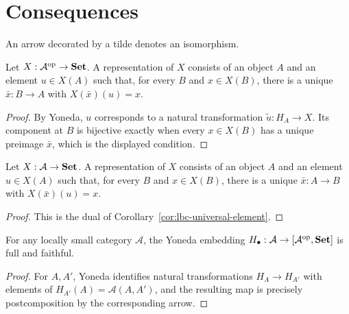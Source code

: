 \section{Consequences}
\begin{notation}
\label{not:lbc-invertible-arrow}
An arrow decorated by a tilde denotes an isomorphism.
\end{notation}
\begin{corollary}
\label{cor:lbc-universal-element}
Let $X:\mathcal A^{\mathrm{op}}\to\mathbf{Set}$. A representation of $X$ consists of an
object $A$ and an element $u\in X(A)$ such that, for every $B$ and
$x\in X(B)$, there is a unique $\bar x:B\to A$ with $X(\bar x)(u)=x$.
\end{corollary}
\begin{proof}
By Yoneda, $u$ corresponds to a natural transformation $\widetilde u:H_A\to X$.
Its component at $B$ is bijective exactly when every $x\in X(B)$ has a unique
preimage $\bar x$, which is the displayed condition.
\end{proof}

\begin{corollary}
\label{cor:lbc-universal-element-cov}
Let $X:\mathcal A\to\mathbf{Set}$. A representation of $X$ consists of an object $A$
and an element $u\in X(A)$ such that, for every $B$ and $x\in X(B)$, there is
a unique $\bar x:A\to B$ with $X(\bar x)(u)=x$.
\end{corollary}
\begin{proof}
This is the dual of Corollary~\ref{cor:lbc-universal-element}.
\end{proof}

\begin{corollary}
\label{cor:lbc-yoneda-full-faithful}
For any locally small category $\mathcal A$, the Yoneda embedding
$H_{\bullet}:\mathcal A\to[\mathcal A^{\mathrm{op}},\mathbf{Set}]$ is full and faithful.
\end{corollary}
\begin{proof}
For $A,A'$, Yoneda identifies natural transformations $H_A\to H_{A'}$ with
elements of $H_{A'}(A)=\mathcal A(A,A')$, and the resulting map is precisely
postcomposition by the corresponding arrow.
\end{proof}


